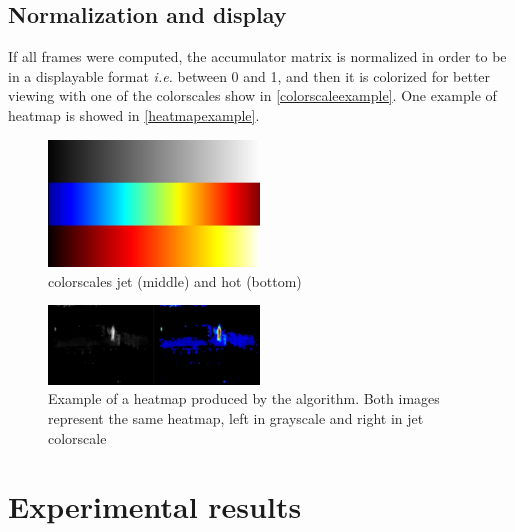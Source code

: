 \documentclass[10pt, conference]{IEEEtran}
\begin{document}
	\subsection{Normalization and display}
	If all frames were computed, the accumulator matrix is normalized in order to be in a displayable format \textit{i.e.} between 0 and 1, and then it is colorized for better viewing with one of the colorscales show in \autoref{colorscaleexample}. One example of heatmap is showed in \autoref{heatmapexample}.
	\begin{figure}[H]
		\centering
		\includegraphics[width=0.5\textwidth,height=0.05\textheight]{figs/colorscaleexample}
		\caption{colorscales jet (middle) and hot (bottom)}
		\label{colorscaleexample}
	\end{figure}
	\begin{figure}[H]
		\centering
		\includegraphics[width=0.5\textwidth]{figs/heatmapexample}
		\caption{Example of a heatmap produced by the algorithm. Both images represent the same heatmap, left in grayscale and right in jet colorscale}
		\label{heatmapexample}
	\end{figure}
	
	
	\section{Experimental results}
\end{document}

